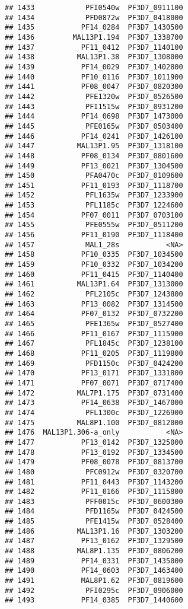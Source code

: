 \documentclass[12pt, a4paper]{article}\usepackage[]{graphicx}\usepackage[]{color}
\makeatletter
\newenvironment{kframe}{%
 \def\at@end@of@kframe{}%
 \ifinner\ifhmode%
  \def\at@end@of@kframe{\end{minipage}}%
  \begin{minipage}{\columnwidth}%
 \fi\fi%
 \def\FrameCommand##1{\hskip\@totalleftmargin \hskip-\fboxsep
 \colorbox{shadecolor}{##1}\hskip-\fboxsep
     \hskip-\linewidth \hskip-\@totalleftmargin \hskip\columnwidth}%
 \MakeFramed {\advance\hsize-\width
   \@totalleftmargin\z@ \linewidth\hsize
   \@setminipage}}%
 {\par\unskip\endMakeFramed%
 \at@end@of@kframe}
\newenvironment{knitrout}{}{} %
\makeatother
\begin{document}
\begin{knitrout}
\begin{kframe}
\begin{verbatim}
## 1433            PFI0540w  PF3D7_0911100
## 1434            PFD0872w  PF3D7_0418000
## 1435           PF14_0284  PF3D7_1430500
## 1436         MAL13P1.194  PF3D7_1338700
## 1437           PF11_0412  PF3D7_1140100
## 1438          MAL13P1.38  PF3D7_1308000
## 1439           PF14_0029  PF3D7_1402800
## 1440           PF10_0116  PF3D7_1011900
## 1441           PF08_0047  PF3D7_0820300
## 1442            PFE1320w  PF3D7_0526500
## 1443            PFI1515w  PF3D7_0931200
## 1444           PF14_0698  PF3D7_1473000
## 1445            PFE0165w  PF3D7_0503400
## 1446           PF14_0241  PF3D7_1426100
## 1447          MAL13P1.95  PF3D7_1318100
## 1448           PF08_0134  PF3D7_0801600
## 1449           PF13_0021  PF3D7_1304500
## 1450            PFA0470c  PF3D7_0109600
## 1451           PF11_0193  PF3D7_1118700
## 1452            PFL1635w  PF3D7_1233900
## 1453            PFL1185c  PF3D7_1224600
## 1454           PF07_0011  PF3D7_0703100
## 1455            PFE0555w  PF3D7_0511200
## 1456           PF11_0190  PF3D7_1118400
## 1457            MAL1_28s           <NA>
## 1458           PF10_0335  PF3D7_1034500
## 1459           PF10_0332  PF3D7_1034200
## 1460           PF11_0415  PF3D7_1140400
## 1461          MAL13P1.64  PF3D7_1313000
## 1462            PFL2105c  PF3D7_1243800
## 1463           PF13_0082  PF3D7_1314500
## 1464           PF07_0132  PF3D7_0732200
## 1465            PFE1365w  PF3D7_0527400
## 1466           PF11_0167  PF3D7_1115900
## 1467            PFL1845c  PF3D7_1238100
## 1468           PF11_0205  PF3D7_1119800
## 1469            PFD1150c  PF3D7_0424200
## 1470           PF13_0171  PF3D7_1331800
## 1471           PF07_0071  PF3D7_0717400
## 1472          MAL7P1.175  PF3D7_0731400
## 1473           PF14_0638  PF3D7_1467000
## 1474            PFL1300c  PF3D7_1226900
## 1475          MAL8P1.100  PF3D7_0812000
## 1476  MAL13P1.306-a_only           <NA>
## 1477           PF13_0142  PF3D7_1325000
## 1478           PF13_0192  PF3D7_1334500
## 1479           PF08_0078  PF3D7_0813700
## 1480            PFC0912w  PF3D7_0320700
## 1481           PF11_0443  PF3D7_1143200
## 1482           PF11_0166  PF3D7_1115800
## 1483            PFF0015c  PF3D7_0600300
## 1484            PFD1165w  PF3D7_0424500
## 1485            PFE1415w  PF3D7_0528400
## 1486          MAL13P1.16  PF3D7_1303200
## 1487           PF13_0162  PF3D7_1329500
## 1488          MAL8P1.135  PF3D7_0806200
## 1489           PF14_0331  PF3D7_1435000
## 1490           PF14_0603  PF3D7_1463400
## 1491           MAL8P1.62  PF3D7_0819600
## 1492            PFI0295c  PF3D7_0906000
## 1493           PF14_0385  PF3D7_1440600

\end{verbatim}
\end{kframe}
\end{knitrout}
\end{document}

